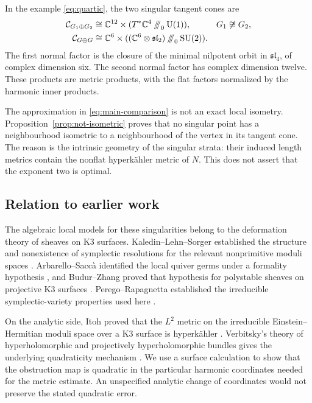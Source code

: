 In the example \eqref{eq:quartic}, the two singular tangent cones
are
\begin{equation}\label{eq:quartic-cones}
 \begin{aligned}
 \Cone_{G_1\oplus G_2}
  &\cong \CC^{12}\times(T^*\CC^4\hkr_0\U(1)),
       &&G_1\not\cong G_2,\\
 \Cone_{G\oplus G}
  &\cong \CC^6\times
       ((\CC^6\otimes\mathfrak{sl}_2)\hkr_0\SU(2)).
 \end{aligned}
\end{equation}
The first normal factor is the closure of the minimal nilpotent
orbit in $\mathfrak{sl}_4$, of complex dimension six. The second
normal factor has complex dimension twelve. These products are
metric products, with the flat factors normalized by the harmonic
inner products.

The approximation in \eqref{eq:main-comparison} is not an exact
local isometry. Proposition~\ref{prop:not-isometric} proves that
no singular point has a neighbourhood isometric to a neighbourhood
of the vertex in its tangent cone. The reason is the intrinsic
geometry of the singular strata: their induced length metrics
contain the nonflat hyperk\"ahler metric of $N$. This does not
assert that the exponent two is optimal.

\subsection{Relation to earlier work}
The algebraic local models for these singularities belong to the
deformation theory of sheaves on K3 surfaces. Kaledin--Lehn--Sorger
established the structure and nonexistence of symplectic resolutions
for the relevant nonprimitive moduli spaces \cite{kls06}.
Arbarello--Sacc\`a identified the local quiver germs under
a formality hypothesis \cite[Propositions~4.4 and~6.1]{as18},
and Budur--Zhang proved that hypothesis for polystable sheaves
on projective K3 surfaces \cite[Theorem~1.2]{bz19}.
Perego--Rapagnetta established the irreducible
symplectic-variety properties used here \cite{pr23}.

On the analytic side, Itoh proved that the $L^2$ metric on the
irreducible Einstein--Hermitian moduli space over a K3 surface is
hyperk\"ahler \cite[Theorem~2.1 and Remark~(iii)]{itoh88}.
Verbitsky's theory of hyperholomorphic and projectively
hyperholomorphic bundles gives the underlying quadraticity
mechanism \cite[Theorems~6.2, 7.1 and 11.2, arXiv version]{verbitsky96}.
We use a surface calculation to show that the obstruction map is
quadratic in the particular harmonic coordinates needed for the
metric estimate. An unspecified analytic change of coordinates
would not preserve the stated quadratic error.

